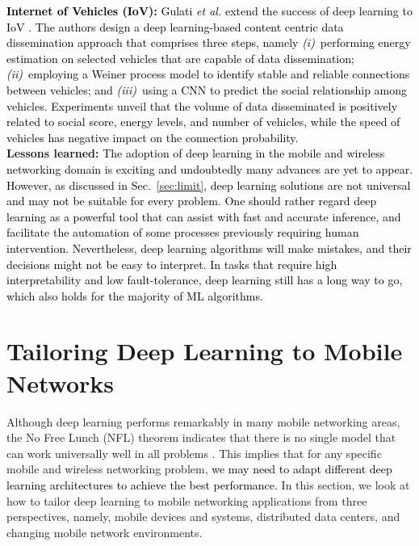 \documentclass[journal,comsoc,letter]{IEEEtran}
\newcommand{\edit}[1]{\textcolor{black}{#1}}
\newcommand{\rev}[1]{\textcolor{black}{#1}}
\begin{document}
\noindent\edit{\textbf{Internet of Vehicles (IoV):} Gulati \emph{et al.} extend the success of deep learning to IoV  \cite{gulati2018deep}. The authors design a deep learning-based content centric data dissemination approach that comprises three steps, namely \emph{(i)}~performing energy estimation on selected vehicles that are capable of data  dissemination; \emph{(ii)}~employing a Weiner process model to identify stable and reliable connections between vehicles;  and \emph{(iii)}~using a CNN to predict the social relationship among vehicles. Experiments unveil that the volume of data disseminated is positively related to social score, energy levels, and number of vehicles, while the speed of vehicles has negative impact on the connection probability.}\\

\textbf{Lessons learned:} \rev{The adoption of deep learning in the mobile and wireless networking domain is exciting and undoubtedly many advances are yet to appear. However, as discussed in Sec.~\ref{sec:limit},
deep learning solutions are not universal and may not be suitable for every problem. One should  rather regard deep learning as a powerful tool that can assist with fast and accurate inference, and facilitate the automation of some processes previously requiring human intervention. Nevertheless, deep learning algorithms will make mistakes, and their decisions might not be easy to interpret. In tasks that require high interpretability and low fault-tolerance, deep learning still has a long way to go, which also holds for the majority of ML algorithms.}



\section{Tailoring Deep Learning to Mobile Networks}\label{sec:tailor}
Although deep learning performs remarkably in many mobile networking areas, the No Free Lunch (NFL) theorem indicates that there is no single model that can work universally well in all problems \cite{wolpert1997no}. This implies that for any specific mobile and wireless networking problem, \edit{we may need to adapt different deep learning architectures to achieve the best performance.} In this section, we look at how to tailor deep learning to mobile networking applications from three perspectives, namely, mobile devices and systems, distributed data centers, and changing mobile network environments.
\end{document}

